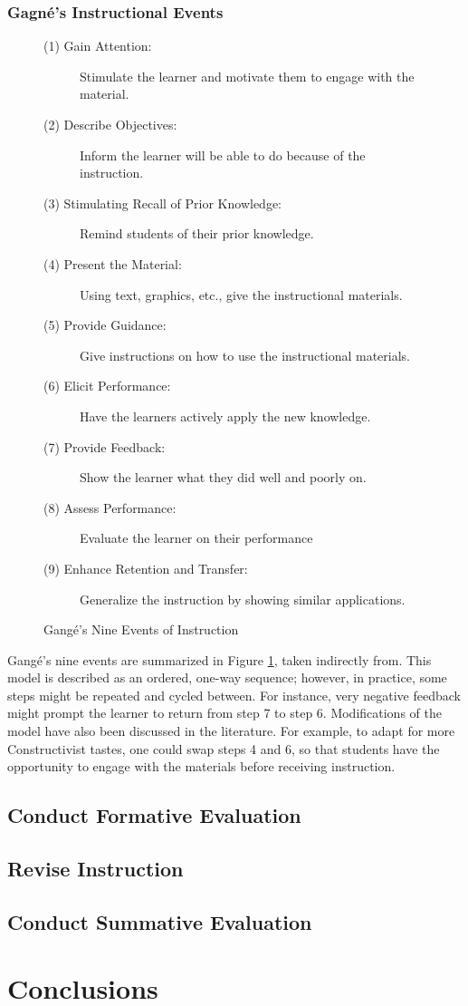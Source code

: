 \documentclass{acm_proc_article-sp}
\begin{document}
\subsubsection{Gagn\'{e}'s Instructional Events}

\begin{figure}
\begin{description}
	\item[(1) Gain Attention:] Stimulate the learner and motivate them to engage with the material.
	\item[(2) Describe Objectives:] Inform the learner will be able to do because of the instruction.
	\item[(3) Stimulating Recall of Prior Knowledge:] Remind students of their prior knowledge.
	\item[(4) Present the Material:] Using text, graphics, etc., give the instructional materials.
	\item[(5) Provide Guidance:] Give instructions on how to use the instructional materials.
	\item[(6) Elicit Performance:] Have the learners actively apply the new knowledge.
	\item[(7) Provide Feedback:] Show the learner what they did well and poorly on.
	\item[(8) Assess Performance:] Evaluate the learner on their performance
	\item[(9) Enhance Retention and Transfer:] Generalize the instruction by showing similar applications.
\end{description}
\caption{Gang\'{e}'s Nine Events of Instruction}
\label{gange-events}
\end{figure}

Gang\'{e}'s nine events are summarized in Figure \ref{gange-events}, taken indirectly from\cite{gagne1985conditions}. This model is described as an ordered, one-way sequence; however, in practice, some steps might be repeated and cycled between. For instance, very negative feedback might prompt the learner to return from step 7 to step 6. Modifications of the model have also been discussed in the literature. For example, to adapt for more Constructivist tastes, one could swap steps 4 and 6, so that students have the opportunity to engage with the materials before receiving instruction.


\subsection{Conduct Formative Evaluation}
\subsection{Revise Instruction}
\subsection{Conduct Summative Evaluation}

\section{Conclusions}




 
\end{document}
